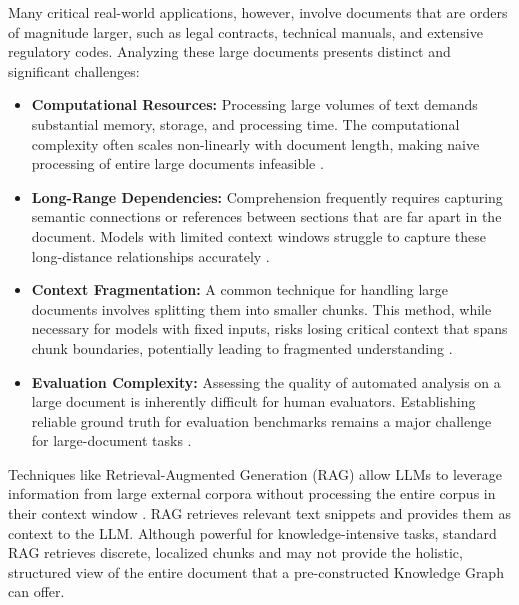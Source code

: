 Many critical real-world applications, however, involve documents that are orders of magnitude larger, such as legal contracts, technical manuals, and extensive regulatory codes. Analyzing these large documents presents distinct and significant challenges:
\begin{itemize}
    \item \textbf{Computational Resources:} Processing large volumes of text demands substantial memory, storage, and processing time. The computational complexity often scales non-linearly with document length, making naive processing of entire large documents infeasible \parencite{RefWorks:RefID:81-vaswani2017attention}.
    \item \textbf{Long-Range Dependencies:} Comprehension frequently requires capturing semantic connections or references between sections that are far apart in the document. Models with limited context windows struggle to capture these long-distance relationships accurately \parencite{RefWorks:RefID:99-liu2025comprehensive, RefWorks:RefID:101-zhao2023survey}.
    \item \textbf{Context Fragmentation:} A common technique for handling large documents involves splitting them into smaller chunks. This method, while necessary for models with fixed inputs, risks losing critical context that spans chunk boundaries, potentially leading to fragmented understanding \parencite{RefWorks:RefID:105-chen2024dense, RefWorks:RefID:104-qu2024semantic}.
    \item \textbf{Evaluation Complexity:} Assessing the quality of automated analysis on a large document is inherently difficult for human evaluators. Establishing reliable ground truth for evaluation benchmarks remains a major challenge for large-document tasks \parencite{RefWorks:RefID:116-shaham2022scrolls}.
\end{itemize}
Techniques like Retrieval-Augmented Generation (RAG) allow LLMs to leverage information from large external corpora without processing the entire corpus in their context window \parencite{RefWorks:RefID:158-lewis2020retrievalaugmented}. RAG retrieves relevant text snippets and provides them as context to the LLM. Although powerful for knowledge-intensive tasks, standard RAG retrieves discrete, localized chunks and may not provide the holistic, structured view of the entire document that a pre-constructed Knowledge Graph can offer.

